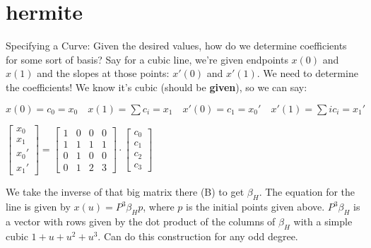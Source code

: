 \documentclass{article}
\begin{document}
\section{hermite} %
\label{sec:hermite}
Specifying a Curve: Given the desired values, how do we determine coefficients for some sort of basis? Say for a cubic line, we're given endpoints $x(0)$ and $x(1)$ and the slopes at those points: $x'(0)$  and $x'(1)$. We need to determine the coefficients! We know it's cubic (should be {\bf given}), so we can say:
\begin{center}
$x(0)=c_0=x_0 \quad x(1)=\sum c_i = x_1 \quad x'(0)=c_1=x_0' \quad x'(1)=\sum ic_i=x_1'$	

$\begin{bmatrix} x_0 \\ x_1 \\ x_0' \\ x_1' \end{bmatrix} = \begin{bmatrix} 1 & 0 & 0 & 0 \\ 1 & 1 & 1 & 1 \\ 0 & 1 & 0 & 0 \\ 0 & 1 & 2 & 3 \end{bmatrix} \cdot \begin{bmatrix} c_0 \\ c_1 \\ c_2 \\ c_3 \end{bmatrix} $
	\end{center}
	We take the inverse of that big matrix there (B) to get $\beta_H$. The equation for the line is given by $x(u) = P^3\beta_Hp$, where $p$ is the initial points given above. $P^3\beta_H$ is a vector with rows given by the dot product of the columns of  $\beta_H$ with a simple cubic $1+u+u^2+u^3$. Can do this construction for any odd degree.

\end{document}
